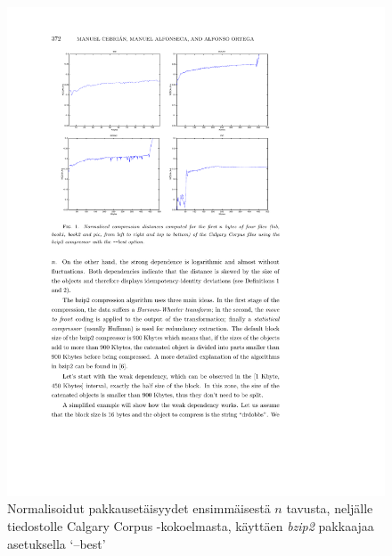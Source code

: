 \documentclass[12pt,finnish]{tktltiki2}
\theoremstyle{definition}
\theoremstyle{remark}
\begin{document}
    \begin{figure}[!htb]
      \includegraphics[width=\textwidth]{img/bzip2-best}
      \caption{Normalisoidut pakkausetäisyydet ensimmäisestä $n$ tavusta, neljälle tiedostolle Calgary Corpus -kokoelmasta, käyttäen \emph{bzip2} pakkaajaa asetuksella `--best' \cite{cebrian2005common}}
      \label{fig:(bzip2-best)}
    \end{figure}
\end{document}
